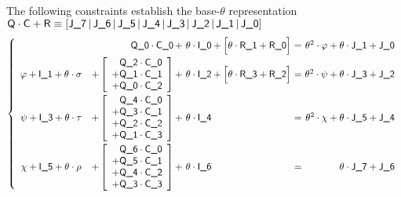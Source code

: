 \noindent The following constraints establish the base-$\theta$ representation
$
\textsf{Q} \cdot \textsf{C} + \textsf{R}
\equiv
[\textsf{J\_7} \,|\, \textsf{J\_6} \,|\, \textsf{J\_5} \,|\, \textsf{J\_4} \,|\, 
\textsf{J\_3} \,|\, \textsf{J\_2} \,|\, \textsf{J\_1} \,|\, \textsf{J\_0}]
$
\[
\left\{
\begin{array}{crlcr}
	&
	\col{Q\_0} \cdot \col{C\_0}
	&
	\!\!\!\!\!
	+ \,\, \theta \cdot \col{I\_0}
	+ \Big[\theta \cdot \col{R\_1} + \col{R\_0}\Big]
	& \!\!\!\! = \!\!\!\! & 
	\theta^2 \cdot \varphi + \theta \cdot \col{J\_1} + \col{J\_0} \vspace{1mm} \\
	\varphi
	+ \col{I\_1}
	+ \theta\cdot\sigma
	&
	+
	\left[\begin{array}{r}
		\col{Q\_2} \cdot \col{C\_0} \\
	+	\col{Q\_1} \cdot \col{C\_1} \\
	+	\col{Q\_0} \cdot \col{C\_2} \\
	\end{array}\right]
	&
	\!\!\!\!\!
	+ \,\, \theta \cdot \col{I\_2}
	+ \Big[\theta \cdot \col{R\_3} + \col{R\_2}\Big]
	& \!\!\!\! = \!\!\!\! & 
	\theta^2 \cdot \psi + \theta \cdot \col{J\_3} + \col{J\_2} \vspace{1mm} \\
	\psi
	+ \col{I\_3}
	+ \theta\cdot\tau
	&
	\!\!\!\!
	+
	\left[\begin{array}{r}
		\col{Q\_4} \cdot \col{C\_0} \\
	+	\col{Q\_3} \cdot \col{C\_1} \\
	+	\col{Q\_2} \cdot \col{C\_2} \\
	+	\col{Q\_1} \cdot \col{C\_3} \\
	\end{array}\right]
	&
	\!\!\!\!\!
	+ \,\, \theta \cdot \col{I\_4}
	& \!\!\!\! = \!\!\!\! & 
	\theta^2 \cdot \chi + \theta \cdot \col{J\_5} + \col{J\_4} \vspace{1mm} \\
	\chi
	+ \col{I\_5}
	+ \theta\cdot\rho
	&
	\!\!\!\!
	+
	\left[\begin{array}{r}
		\col{Q\_6} \cdot \col{C\_0} \\
	+	\col{Q\_5} \cdot \col{C\_1} \\
	+	\col{Q\_4} \cdot \col{C\_2} \\
	+	\col{Q\_3} \cdot \col{C\_3} \\
	\end{array}\right]
	&
	\!\!\!\!\!
	+ \,\, \theta \cdot \col{I\_6}
	& \!\!\!\! = \!\!\!\! &
	\theta \cdot \col{J\_7} + \col{J\_6} \\
\end{array}
\right.
\]